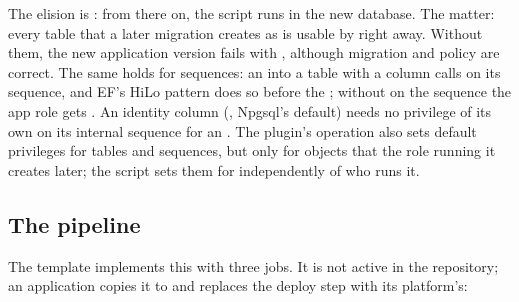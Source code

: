 The elision is : from there on, the script runs in the new
database. The  matter: every table that a later migration creates as
 is usable by  right away. Without
them, the new application version fails with , although migration and
policy are correct. The same holds for sequences: an  into a table with a
 column calls  on its sequence, and EF's HiLo pattern does so before
the ; without  on the sequence the app role gets . An identity column (, Npgsql's default)
needs no privilege of its own on its internal sequence for an . The plugin's
 operation also sets default privileges
for tables and sequences, but only for objects that the role running it creates later; the
script sets them for  independently of who runs it.

\subsection*{The pipeline}

\begin{flowdiagram}
\end{flowdiagram}

The template 
implements this with three jobs. It is not active in the repository; an application copies it
to  and replaces the deploy step with its platform's:

